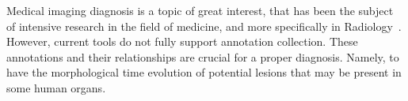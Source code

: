 \documentclass{chi-ext}
\begin{document}
\vfill



Medical imaging diagnosis is a topic of great interest, that has been the subject of intensive research in the field of medicine, and more specifically in Radiology~\cite{doi2005current, doi2007computer, seibel2005medical}. However, current tools do not fully support annotation collection. These annotations and their relationships are crucial for a proper diagnosis. Namely, to have the morphological time evolution of potential lesions that may be present in some human organs.
\end{document}

